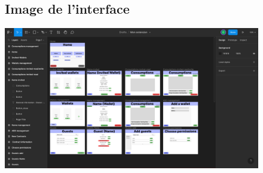 \newpage
\begin{figure}[h]
\subsection{Image de l'interface}
\centering
\includegraphics[scale = 0.5]{Extension-claire/Interface-claire/img/MonInterface.pdf}
\end{figure}
